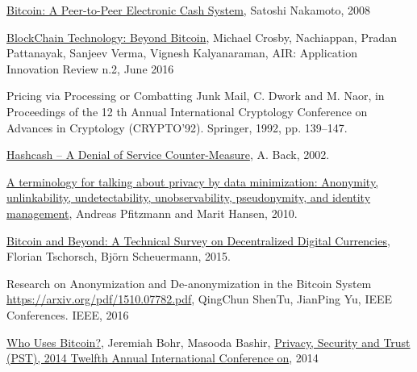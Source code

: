%
%
%
\begin{thebibliography}{1}

\href{http://bitcoin.org/bitcoin.pdf}{Bitcoin: A Peer-to-Peer Electronic Cash
System}, Satoshi Nakamoto, 2008

\href{http://scet.berkeley.edu/wp-content/uploads/AIR-2016-Blockchain.pdf}
{BlockChain Technology: Beyond Bitcoin}, Michael Crosby, Nachiappan, Pradan
Pattanayak, Sanjeev Verma, Vignesh Kalyanaraman, AIR: Application Innovation
Review n.2, June 2016

Pricing via Processing or Combatting Junk Mail, C. Dwork and M. Naor,
in Proceedings of the 12 th Annual International Cryptology Conference on
Advances in Cryptology (CRYPTO’92). Springer, 1992, pp. 139–147.

\href{http://www.hashcash.org/papers/hashcash.pdf}{Hashcash – A Denial of
Service Counter-Measure}, A. Back, 2002.

\href{http://dud.inf.tu-dresden.de/literatur/Anon_Terminology_v0.34.pdf}{A
terminology for talking about privacy by data minimization: Anonymity,
unlinkability, undetectability, unobservability, pseudonymity, and identity
management}, Andreas Pfitzmann and Marit Hansen, 2010.

\href{http://ieeexplore.ieee.org/document/7423672/}{Bitcoin and Beyond: A
Technical Survey on Decentralized Digital Currencies}, Florian Tschorsch, Björn
Scheuermann, 2015.

Research on Anonymization and De-anonymization in the Bitcoin System
\url{https://arxiv.org/pdf/1510.07782.pdf}, QingChun ShenTu, JianPing Yu,
IEEE Conferences. IEEE, 2016

\href{http://ieeexplore.ieee.org/abstract/document/6890928/}{Who Uses Bitcoin?},
Jeremiah Bohr, Masooda Bashir, 
\href{http://ieeexplore.ieee.org/xpl/mostRecentIssue.jsp?punumber=6883276}
{Privacy, Security and Trust (PST), 2014 Twelfth Annual International
Conference on}, 2014


\end{thebibliography}
